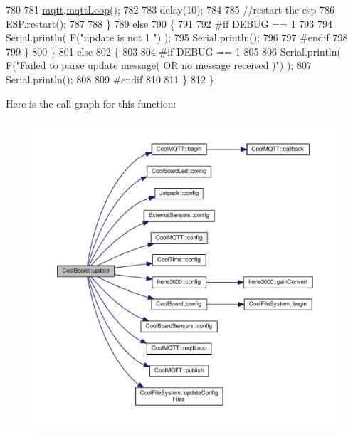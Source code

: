 \begin{DoxyCode}
780             
781             \hyperlink{classCoolBoard_a2399f44d7c23c1149a335cb3b46d90f1}{mqtt}.\hyperlink{classCoolMQTT_aa5eaae967b562b62cbcf2b8d81f6e5d5}{mqttLoop}();
782 
783             delay(10);
784             
785             \textcolor{comment}{//restart the esp}
786             ESP.restart();
787                 
788         \}
789         \textcolor{keywordflow}{else}
790         \{
791         
792 \textcolor{preprocessor}{        #if DEBUG == 1 }
793 
794             Serial.println( F(\textcolor{stringliteral}{"update is not 1 "}) );
795             Serial.println();
796         
797 \textcolor{preprocessor}{        #endif}
798 
799         \}
800     \}
801     \textcolor{keywordflow}{else}
802     \{
803     
804 \textcolor{preprocessor}{    #if DEBUG == 1}
805 
806         Serial.println( F(\textcolor{stringliteral}{"Failed to parse update message( OR no message received )"}) );
807         Serial.println();
808     
809 \textcolor{preprocessor}{    #endif}
810     
811     \}       
812 \}
\end{DoxyCode}
Here is the call graph for this function\+:
\nopagebreak
\begin{figure}[H]
\begin{center}
\leavevmode
\includegraphics[width=350pt]{classCoolBoard_a8612756d3f73198cdde857a66f0fe690_cgraph}
\end{center}
\end{figure}
